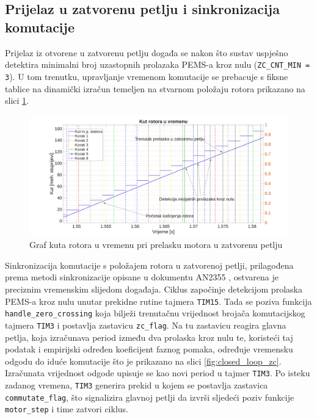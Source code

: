 \documentclass[diplomskirad]{fer}
\begin{document}
\subsection{Prijelaz u zatvorenu petlju i sinkronizacija komutacije}
\label{ssec:prijelaz_u_zatvorenu_petlju}

Prijelaz iz otvorene u zatvorenu petlju događa se nakon što sustav uspješno
detektira minimalni broj uzastopnih prolazaka PEMS-a kroz nulu
(\texttt{ZC\_CNT\_MIN = 3}). U tom trenutku, upravljanje vremenom komutacije se
prebacuje s fiksne tablice na dinamički izračun temeljen na stvarnom položaju
rotora prikazano na slici \ref{fig:closed_loop}.

\begin{figure}[h!]
	\centering
	\includegraphics[width=\textwidth]{csv/closed_loop.pdf}
	\caption{Graf kuta rotora u vremenu pri prelasku motora u zatvorenu petlju}
	\label{fig:closed_loop}
\end{figure}

Sinkronizacija komutacije s položajem rotora u zatvorenoj petlji, prilagođena
prema metodi sinkronizacije opisane u dokumentu AN2355 \cite{NXP_AN2355},
ostvarena je preciznim vremenskim slijedom događaja. Ciklus započinje
detekcijom prolaska PEMS-a kroz nulu unutar prekidne rutine tajmera
\texttt{TIM15}. Tada se poziva funkcija \texttt{handle\_zero\_crossing} koja
bilježi trenutačnu vrijednost brojača komutacijskog tajmera \texttt{TIM3} i
postavlja zastavicu \texttt{zc\_flag}. Na tu zastavicu reagira glavna petlja,
koja izračunava period između dva prolaska kroz nulu te, koristeći taj podatak
i empirijski određen koeficijent faznog pomaka, određuje vremensku odgodu do
iduće komutacije što je prikazano na slici \ref{fig:closed_loop_zc}. Izračunata vrijednost odgode upisuje se kao novi period u
tajmer \texttt{TIM3}. Po isteku zadanog vremena, \texttt{TIM3} generira prekid
u kojem se postavlja zastavica \texttt{commutate\_flag}, što signalizira
glavnoj petlji da izvrši sljedeći poziv funkcije \texttt{motor\_step} i time
zatvori ciklus.
\end{document}
